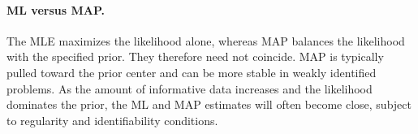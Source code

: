 \paragraph{ML versus MAP.}
The MLE maximizes the likelihood alone, whereas MAP balances the likelihood with
the specified prior. They therefore need not coincide. MAP is typically pulled
toward the prior center and can be more stable in weakly identified problems.
As the amount of informative data increases and the likelihood dominates the prior,
the ML and MAP estimates will often become close, subject to regularity and
identifiability conditions.

